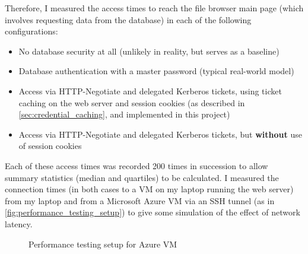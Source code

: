 \documentclass[12pt]{report}
\begin{document}
Therefore, I measured the access times to reach the file browser main page (which involves requesting data from the database) in each of the following configurations:
\begin{itemize}
\item
  No database security at all (unlikely in reality, but serves as a baseline)
\item
  Database authentication with a master password (typical real-world model)
\item
  Access via HTTP-Negotiate and delegated Kerberos tickets, using ticket caching on the web server and session cookies (as described in \autoref{sec:credential_caching}, and implemented in this project)
\item
  Access via HTTP-Negotiate and delegated Kerberos tickets, but \textbf{without} use of session cookies
\end{itemize}

Each of these access times was recorded 200 times in succession to allow summary statistics (median and quartiles) to be calculated. I measured the connection times (in both cases to a VM on my laptop running the web server) from my laptop and from a Microsoft Azure VM via an SSH tunnel (as in \autoref{fig:performance_testing_setup}) to give some simulation of the effect of network latency.

\begin{figure}[ht]
  \begin{center}
  \end{center}
  \caption{Performance testing setup for Azure VM}
  \label{fig:performance_testing_setup}
\end{figure}
\end{document}
